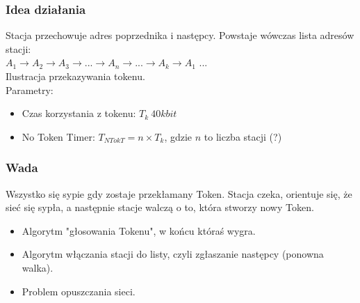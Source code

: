 			\subsubsection{Idea działania}
				Stacja przechowuje adres poprzednika i następcy. Powstaje wówczas lista adresów stacji:\\
				$ A_1 \rightarrow A_2 \rightarrow A_3 \rightarrow ... \rightarrow A_n \rightarrow ... \rightarrow A_k \rightarrow A_1 $ ...\\
				Ilustracja przekazywania tokenu.\\
				Parametry:
				\begin{itemize}
					\item Czas korzystania z tokenu: $ T_k~40kbit $
					\item No Token Timer: $ T_{NTokT}=n\times T_k $, gdzie $ n $ to liczba stacji (?)
				\end{itemize}
			\subsubsection{Wada}
				Wszystko się sypie gdy zostaje przekłamany Token. Stacja czeka, orientuje się, że sieć się sypła, a następnie stacje walczą o to, która stworzy nowy Token.
				\begin{itemize}
					\item Algorytm "głosowania Tokenu", w końcu któraś wygra.
					\item Algorytm włączania stacji do listy, czyli zgłaszanie następcy (ponowna walka).
					\item Problem opuszczania sieci.
				\end{itemize}
